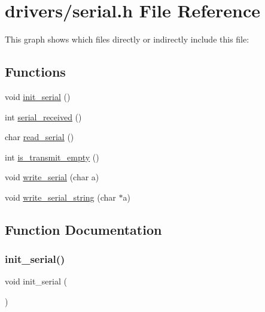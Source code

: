 \hypertarget{a00053}{}\section{drivers/serial.h File Reference}
\label{a00053}
This graph shows which files directly or indirectly include this file\+:
\subsection*{Functions}
\begin{DoxyCompactItemize}
\item 
void \hyperlink{a00053_acfb6f6d615183fc2f71e79dfbadfe27d_acfb6f6d615183fc2f71e79dfbadfe27d}{init\+\_\+serial} ()
\item 
int \hyperlink{a00053_af10f0e64ba89e8635aa7245ca08297c5_af10f0e64ba89e8635aa7245ca08297c5}{serial\+\_\+received} ()
\item 
char \hyperlink{a00053_ad343a7018f74662f794968dfa0523841_ad343a7018f74662f794968dfa0523841}{read\+\_\+serial} ()
\item 
int \hyperlink{a00053_a01fe5504f7b8f4eee1545737495bae76_a01fe5504f7b8f4eee1545737495bae76}{is\+\_\+transmit\+\_\+empty} ()
\item 
void \hyperlink{a00053_aac3c84e21fffc4696d8969ca6955bfc8_aac3c84e21fffc4696d8969ca6955bfc8}{write\+\_\+serial} (char a)
\item 
void \hyperlink{a00053_aabbe45d6670f606c53ba38a5fb14b650_aabbe45d6670f606c53ba38a5fb14b650}{write\+\_\+serial\+\_\+string} (char $\ast$a)
\end{DoxyCompactItemize}


\subsection{Function Documentation}
\mbox{\label{a00053_acfb6f6d615183fc2f71e79dfbadfe27d_acfb6f6d615183fc2f71e79dfbadfe27d}} 
\subsubsection{\texorpdfstring{init\+\_\+serial()}{init\_serial()}}
{\footnotesize\ttfamily void init\+\_\+serial (\begin{DoxyParamCaption}{ }\end{DoxyParamCaption})}



